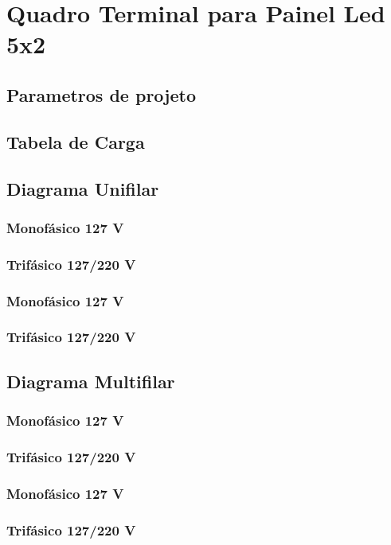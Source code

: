 \section{Quadro Terminal para Painel Led 5x2}
\subsection{Parametros de projeto}
\subsection{Tabela de Carga}
\subsection{Diagrama Unifilar}
\subsubsection{Monofásico 127 V}
\subsubsection{Trifásico 127/220 V}
\subsubsection{Monofásico 127 V}
\subsubsection{Trifásico 127/220 V}

\subsection{Diagrama Multifilar}
\subsubsection{Monofásico 127 V}
\subsubsection{Trifásico 127/220 V}
\subsubsection{Monofásico 127 V}
\subsubsection{Trifásico 127/220 V}

